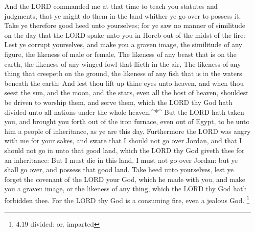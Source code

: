  And the LORD commanded me at that time to teach you
statutes and judgments, that ye might do them in the land whither ye go
over to possess it.  Take ye therefore good heed unto
yourselves; for ye saw no manner of similitude on the day that the LORD
spake unto you in Horeb out of the midst of the fire:  Lest
ye corrupt yourselves, and make you a graven image, the similitude of
any figure, the likeness of male or female,  The likeness
of any beast that is on the earth, the likeness of any winged fowl that
flieth in the air,  The likeness of any thing that creepeth
on the ground, the likeness of any fish that is in the waters beneath
the earth:  And lest thou lift up thine eyes unto heaven,
and when thou seest the sun, and the moon, and the stars, even all the
host of heaven, shouldest be driven to worship them, and serve them,
which the LORD thy God hath divided unto all nations under the whole
heaven.\^{}*\^{}  But the LORD hath taken you, and brought
you forth out of the iron furnace, even out of Egypt, to be unto him a
people of inheritance, as ye are this day.  Furthermore the
LORD was angry with me for your sakes, and sware that I should not go
over Jordan, and that I should not go in unto that good land, which the
LORD thy God giveth thee for an inheritance:  But I must
die in this land, I must not go over Jordan: but ye shall go over, and
possess that good land.  Take heed unto yourselves, lest ye
forget the covenant of the LORD your God, which he made with you, and
make you a graven image, or the likeness of any thing, which the LORD
thy God hath forbidden thee.  For the LORD thy God is a
consuming fire, even a jealous God. \footnote{4.19 divided: or, imparted}

